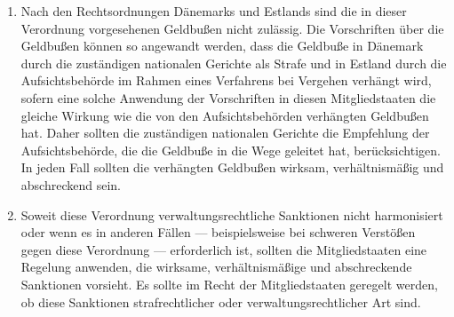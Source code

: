 \begin{enumerate}

   \item Nach den Rechtsordnungen Dänemarks und Estlands sind die in dieser Verordnung vorgesehenen Geldbußen nicht
    zulässig. Die Vorschriften über die Geldbußen können so angewandt werden, dass die Geldbuße in Dänemark durch die
    zuständigen nationalen Gerichte als Strafe und in Estland durch die Aufsichtsbehörde im Rahmen eines Verfahrens bei
    Vergehen verhängt wird, sofern eine solche Anwendung der Vorschriften in diesen Mitgliedstaaten die gleiche Wirkung
    wie die von den Aufsichtsbehörden verhängten Geldbußen hat. Daher sollten die zuständigen nationalen Gerichte die
    Empfehlung der Aufsichtsbehörde, die die Geldbuße in die Wege geleitet hat, berücksichtigen. In jeden Fall sollten
    die verhängten Geldbußen wirksam, verhältnismäßig und abschreckend sein.%
   \label{itm:eg-151}
   

   \item Soweit diese Verordnung verwaltungsrechtliche Sanktionen nicht harmonisiert oder wenn es in anderen Fällen —
    beispielsweise bei schweren Verstößen gegen diese Verordnung — erforderlich ist, sollten die Mitgliedstaaten eine
    Regelung anwenden, die wirksame, verhältnismäßige und abschreckende Sanktionen vorsieht. Es sollte im Recht der
    Mitgliedstaaten geregelt werden, ob diese Sanktionen strafrechtlicher oder verwaltungsrechtlicher Art sind.%
   \label{itm:eg-152}
   


\end{enumerate}

